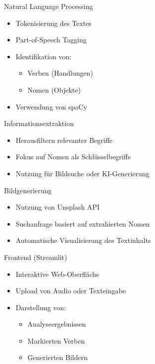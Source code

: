 \documentclass{beamer}
\begin{document}
\begin{frame}{Natural Language Processing}
\begin{itemize}
    \item Tokenisierung des Textes
    \item Part-of-Speech Tagging
    \item Identifikation von:
    \begin{itemize}
        \item Verben (Handlungen)
        \item Nomen (Objekte)
    \end{itemize}
    \item Verwendung von spaCy
\end{itemize}
\end{frame}

\begin{frame}{Informationsextraktion}
\begin{itemize}
    \item Herausfiltern relevanter Begriffe
    \item Fokus auf Nomen als Schlüsselbegriffe
    \item Nutzung für Bildsuche oder KI-Generierung
\end{itemize}
\end{frame}

\begin{frame}{Bildgenerierung}
\begin{itemize}
    \item Nutzung von Unsplash API
    \item Suchanfrage basiert auf extrahierten Nomen
    \item Automatische Visualisierung des Textinhalts
\end{itemize}
\end{frame}

\begin{frame}{Frontend (Streamlit)}
\begin{itemize}
    \item Interaktive Web-Oberfläche
    \item Upload von Audio oder Texteingabe
    \item Darstellung von:
    \begin{itemize}
        \item Analyseergebnissen
        \item Markierten Verben
        \item Generierten Bildern
    \end{itemize}
\end{itemize}
\end{frame}
\end{document}
